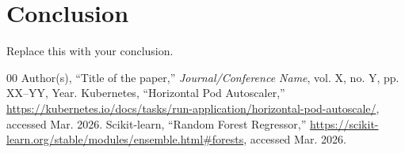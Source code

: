 \documentclass[conference]{IEEEtran}
\begin{document}
\section{Conclusion}
\label{sec:conclusion}
Replace this with your conclusion.

\begin{thebibliography}{00}
 Author(s), ``Title of the paper,'' \textit{Journal/Conference Name}, vol. X, no. Y, pp. XX--YY, Year.
 Kubernetes, ``Horizontal Pod Autoscaler,'' \url{https://kubernetes.io/docs/tasks/run-application/horizontal-pod-autoscale/}, accessed Mar. 2026.
 Scikit-learn, ``Random Forest Regressor,'' \url{https://scikit-learn.org/stable/modules/ensemble.html\#forests}, accessed Mar. 2026.
\end{thebibliography}
\end{document}
